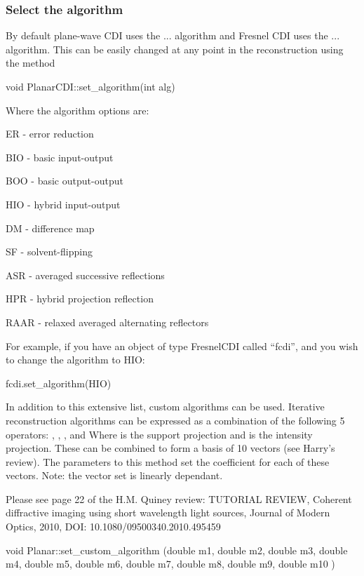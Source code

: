 \documentclass[]{nadia}
\begin{document}
\subsubsection{Select the algorithm}

By default plane-wave CDI uses the ... algorithm and Fresnel CDI uses
the ... algorithm. This can be easily changed at any point in the
reconstruction using the method

\begin{myverbatim}
void PlanarCDI::set_algorithm(int alg) 	
\end{myverbatim}
Where the algorithm options are:
\begin{description} 
\item ER - error reduction 
\item BIO - basic input-output 
\item BOO - basic output-output 
\item HIO - hybrid input-output 
\item DM - difference map 
\item SF - solvent-flipping 
\item ASR - averaged successive reflections 
\item HPR - hybrid projection reflection 
\item RAAR - relaxed averaged alternating reflectors
\end{description}

For example, if you have an object of type FresnelCDI called ``fcdi'', and
you wish to change the algorithm to HIO:
\begin{myverbatim}
fcdi.set_algorithm(HIO) 	
\end{myverbatim}

In addition to this extensive list, custom algorithms can be
used. Iterative reconstruction algorithms can be expressed as a
combination of the following 5 operators: , , , and Where is the
support projection and is the intensity projection. These can be
combined to form a basis of 10 vectors (see Harry's review). The
parameters to this method set the coefficient for each of these
vectors. Note: the vector set is linearly dependant.

Please see page 22 of the H.M. Quiney review: TUTORIAL REVIEW,
Coherent diffractive imaging using short wavelength light sources,
Journal of Modern Optics, 2010, DOI: 10.1080/09500340.2010.495459

\begin{myverbatim}
void Planar::set_custom_algorithm (double m1,
double 	m2,
double 	m3,
double 	m4,
double 	m5,
double 	m6,
double 	m7,
double 	m8,
double 	m9,
double 	m10	 
)
\end{myverbatim}
			
\end{document}
